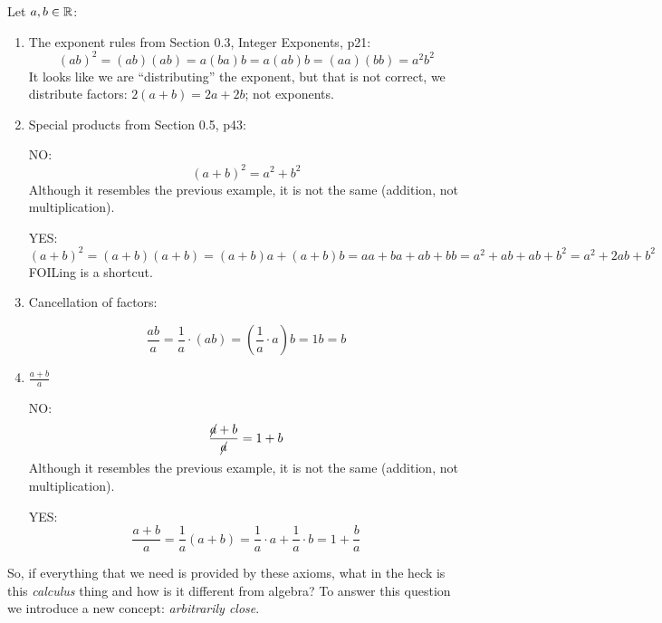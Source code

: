 \documentclass[letterpaper,12pt,fleqn]{article}
\begin{document}
\begin{examples}
  Let \(a,b\in\mathbb{R}\):
  \begin{enumerate}
  \item The exponent rules from Section 0.3, Integer Exponents, p21:
    \[(ab)^2=(ab)(ab)=a(ba)b=a(ab)b=(aa)(bb)=a^2b^2\]
    It looks like we are ``distributing'' the exponent, but that is not correct, we distribute factors:
    \(2(a+b)=2a+2b\); not exponents.

  \item Special products from Section 0.5, p43:
    
    NO:
    \[(a+b)^2=a^2+b^2\]
    Although it resembles the previous example, it is not the same (addition, not multiplication).

    YES:
    \[(a+b)^2=(a+b)(a+b)=(a+b)a+(a+b)b=aa+ba+ab+bb=a^2+ab+ab+b^2=a^2+2ab+b^2\]
    FOILing is a shortcut.

  \item Cancellation of factors:

    \[\frac{ab}{a}=\frac{1}{a}\cdot(ab)=\left(\frac{1}{a}\cdot a\right)b=1b=b\]

  \item \(\frac{a+b}{a}\)

    NO:
    \[\frac{\cancel{a}+b}{\cancel{a}}=1+b\]
    Although it resembles the previous example, it is not the same (addition, not multiplication).

    YES:
    \[\frac{a+b}{a}=\frac{1}{a}(a+b)=\frac{1}{a}\cdot a+\frac{1}{a}\cdot b=1+\frac{b}{a}\]
  \end{enumerate}
\end{examples}

So, if everything that we need is provided by these axioms, what in the heck is this \emph{calculus} thing and how
is it different from algebra?  To answer this question we introduce a new concept: \emph{arbitrarily close}.
\end{document}
